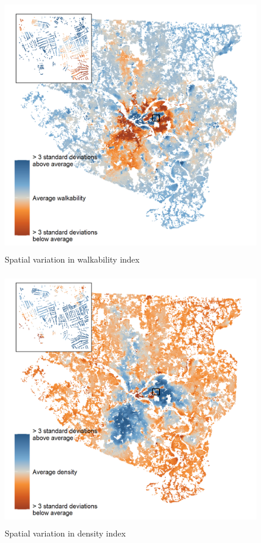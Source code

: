 \documentclass[
]{book}
\begin{document}
\begin{figure}
\includegraphics[width=1\linewidth]{04_figures/walkable} \caption{Spatial variation in walkability index}\label{fig:walk-map}
\end{figure}

\begin{figure}
\includegraphics[width=1\linewidth]{04_figures/dense} \caption{Spatial variation in density index}\label{fig:dense-map}
\end{figure}
\end{document}
